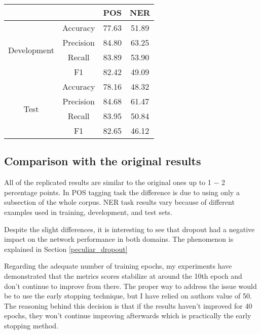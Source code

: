 \begin{center}
\begin{tabular}{ |c|c|c|c| }
\hline
& & {\textbf{POS}} & {\textbf{NER}}\\ \hline
\multirow{4}{*}{Development} & Accuracy & 77.63 & 51.89 \\
 & Precision & 84.80  & 63.25 \\
 & Recall & 83.89 & 53.90 \\
 & F1 & 82.42 & 49.09 \\ \hline
\multirow{4}{*}{Test} & Accuracy & 78.16 & 48.32 \\
 & Precision & 84.68 & 61.47 \\
 & Recall & 83.95 & 50.84 \\
 & F1 & 82.65 & 46.12 \\ \hline
\end{tabular}
\label{tab:no_crf}
\end{center}


\label{comparison}
\subsection{Comparison with the original results}
All of the replicated results are similar to the original ones up to 1 $-$ 2
percentage points. In POS tagging task the difference is due to using only a subsection of
the whole corpus. NER task results vary because of different examples used
in training, development, and test sets.

Despite the slight differences, it is interesting to see that dropout had a
negative impact on the network performance in both domains. The phenomenon is 
explained in Section \ref{peculiar_dropout}

Regarding the adequate number of training epochs, my experiments have
demonstrated that the metrics scores stabilize at around the 10th epoch and
don't continue to improve from there. The proper way to address the issue would
be to use the early stopping technique, but I have relied on authors value of 50.
The reasoning behind this decision
is that if the results haven't improved for 40 epochs, they won't continue
improving afterwards which is practically the early stopping method.

